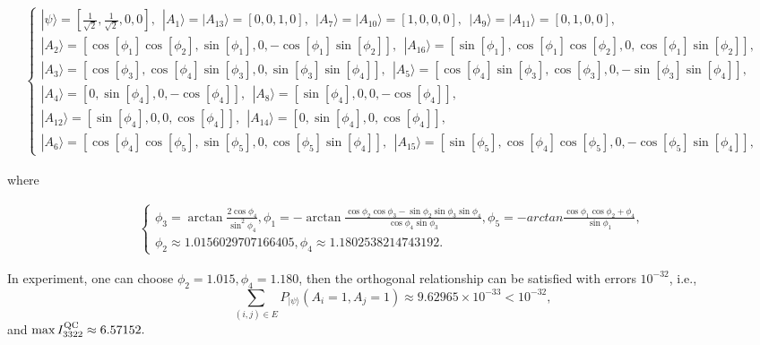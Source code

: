 \documentclass[pra,aps,notitlepage,superscriptaddress,showpacs,showkeys]{revtex4-1}
\theoremstyle{definition}
\theoremstyle{remark}
\begin{document}
\begin{widetext}
\begin{eqnarray}\label{eqAi}
\left\{
  \begin{array}{ll}
    |\psi\rangle=[\frac{1}{\sqrt{2}},\frac{1}{\sqrt{2}},0,0],\ \ |A_1\rangle=|A_{13}\rangle=[0,0,1,0],
    \ \ |A_7\rangle=|A_{10}\rangle=[1,0,0,0],\ \ |A_9\rangle=|A_{11}\rangle=[0,1,0,0],\\
    |A_2\rangle=[\cos{[\phi_1]}\cos{[\phi_2]},\sin{[\phi_1]},0,-\cos{[\phi_1]}\sin{[\phi_2]}],\ \ |A_{16}\rangle=[\sin{[\phi_1]},\cos{[\phi_1]}\cos{[\phi_2]},0,\cos{[\phi_1]}\sin{[\phi_2]}],\\
     |A_3\rangle=[\cos{[\phi_3]},\cos{[\phi_4]}\sin{[\phi_3]},0,\sin{[\phi_3]}\sin{[\phi_4]}],\ \ |A_{5}\rangle=[\cos{[\phi_4]}\sin{[\phi_3]},\cos{[\phi_3]},0,-\sin{[\phi_3]}\sin{[\phi_4]}],\\
     |A_4\rangle=[0,\sin{[\phi_4]},0,-\cos{[\phi_4]}],\ \ |A_{8}\rangle=[\sin{[\phi_4]},0,0,-\cos{[\phi_4]}],\\
     |A_{12}\rangle=[\sin{[\phi_4]},0,0,\cos{[\phi_4]}],\ \ |A_{14}\rangle=[0,\sin{[\phi_4]},0,\cos{[\phi_4]}],\\
     |A_6\rangle=[\cos{[\phi_4]}\cos{[\phi_5]},\sin{[\phi_5]},0,\cos{[\phi_5]}\sin{[\phi_4]}],\ \    |A_{15}\rangle=[\sin{[\phi_5]},\cos{[\phi_4]}\cos{[\phi_5]},0,-\cos{[\phi_5]}\sin{[\phi_4]}],
  \end{array}
\right.
\end{eqnarray}
\end{widetext}
where
\begin{widetext}
\begin{eqnarray}
\left\{
  \begin{array}{ll}
    \phi_{3}=\arctan{\frac{2\cos{\phi_4}}{\sin^2{\phi_4}}},
\phi_{1}=-\arctan{\frac{\cos{\phi_2}\cos{\phi_3}-\sin{\phi_2}\sin{\phi_3}\sin{\phi_4}}{\cos{\phi_4}\sin{\phi_3}}},
\phi_{5}=-arctan{\frac{\cos{\phi_1}\cos{\phi_2+\phi_4}}{\sin{\phi_1}}},\\
\phi_{2}\approx 1.0156029707166405,\phi_{4}\approx 1.1802538214743192.
\end{array}
\right.
\end{eqnarray}
\end{widetext}
In experiment, one can choose $\phi_{2}= 1.015,\phi_{4}= 1.180$, then the orthogonal relationship can be satisfied with errors $10^{-32}$, i.e.,
$$\sum_{(i,j)\in E}P_{|\psi\rangle}(A_i=1,A_j=1)\approx 9.62965\times 10^{-33}<10^{-32},$$
and $\max I_{3322}^{\rm QC}\approx 6.57152.$
\end{document}

